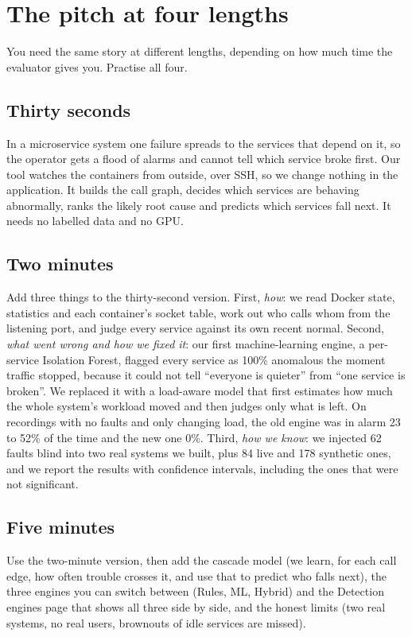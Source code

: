 \section{The pitch at four lengths}
You need the same story at different lengths, depending on how much time the evaluator gives you. Practise all four.

\subsection{Thirty seconds}
\begin{saybox}
In a microservice system one failure spreads to the services that depend on it, so the operator gets a flood of alarms and cannot tell which service broke first. Our tool watches the containers from outside, over SSH, so we change nothing in the application. It builds the call graph, decides which services are behaving abnormally, ranks the likely root cause and predicts which services fall next. It needs no labelled data and no GPU.
\end{saybox}

\subsection{Two minutes}
\begin{saybox}
Add three things to the thirty-second version. First, \emph{how}: we read Docker state, statistics and each container's socket table, work out who calls whom from the listening port, and judge every service against its own recent normal. Second, \emph{what went wrong and how we fixed it}: our first machine-learning engine, a per-service Isolation Forest, flagged every service as 100\% anomalous the moment traffic stopped, because it could not tell ``everyone is quieter'' from ``one service is broken''. We replaced it with a load-aware model that first estimates how much the whole system's workload moved and then judges only what is left. On recordings with no faults and only changing load, the old engine was in alarm 23 to 52\% of the time and the new one 0\%. Third, \emph{how we know}: we injected 62 faults blind into two real systems we built, plus 84 live and 178 synthetic ones, and we report the results with confidence intervals, including the ones that were not significant.
\end{saybox}

\subsection{Five minutes}
Use the two-minute version, then add the cascade model (we learn, for each call edge, how often trouble crosses it, and use that to predict who falls next), the three engines you can switch between (Rules, ML, Hybrid) and the Detection engines page that shows all three side by side, and the honest limits (two real systems, no real users, brownouts of idle services are missed).

